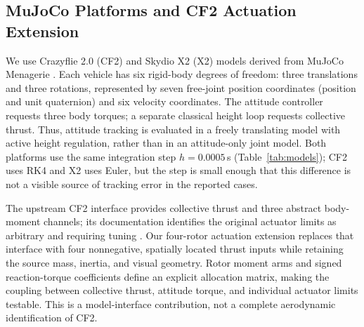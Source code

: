 \documentclass[letterpaper,10pt,conference]{IEEEtran}
\begin{document}
\subsection{MuJoCo Platforms and CF2 Actuation Extension}
We use Crazyflie 2.0 (CF2) and Skydio X2 (X2) models derived from MuJoCo
Menagerie \cite{menagerieModels}. Each vehicle has six rigid-body degrees of freedom: three
translations and three rotations, represented by seven free-joint position
coordinates (position and unit quaternion) and six velocity coordinates.
The attitude controller requests three body torques; a separate classical
height loop requests collective thrust. Thus, attitude tracking is evaluated in a freely translating model with active height regulation, rather than in an attitude-only joint model. Both
platforms use the same integration step $h=0.0005$\,s (Table~\ref{tab:models});
CF2 uses RK4 and X2 uses Euler, but the step is small enough that this
difference is not a visible source of tracking error in the reported cases.

The upstream CF2 interface provides collective thrust and three abstract
body-moment channels; its documentation identifies the original actuator
limits as arbitrary and requiring tuning \cite{menagerieCF2}. Our four-rotor actuation extension replaces that
interface with four nonnegative, spatially located thrust inputs while
retaining the source mass, inertia, and visual geometry. Rotor moment arms
and signed reaction-torque coefficients define an explicit allocation
matrix, making the coupling between collective thrust, attitude torque,
and individual actuator limits testable. This is a model-interface
contribution, not a complete aerodynamic identification of CF2.
\end{document}
